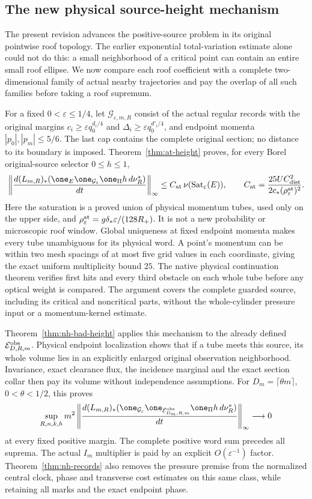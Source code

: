 \subsection*{The new physical source-height mechanism}
The present revision advances the positive-source problem in its
original pointwise roof topology. The earlier exponential
total-variation estimate alone could not do this: a small
neighborhood of a critical point can contain an entire small roof
ellipse. We now compare each roof coefficient with a complete
two-dimensional family of actual nearby trajectories and pay the
overlap of all such families before taking a roof supremum.

For a fixed $0<\varepsilon\le1/4$, let
$\mathcal G_{\varepsilon,m,R}$ consist of the actual regular records
with the original margins
$c_i\ge\varepsilon q_0^{d_i/4}$ and
$\Delta_i\ge\varepsilon q_0^{d'_i/4}$, and endpoint momenta
$|p_0|,|p_m|\le5/6$. The last cap contains the complete original
section; no distance to its boundary is imposed.
Theorem~\ref{thm:at-height} proves, for every Borel original-source
selector $0\le h\le1$,
\[
 \left\|\frac{d(L_{m,R})_*
    (\one_E\one_{\mathcal G_\varepsilon}\one_\Pi h\,d\nu_R^*)}{dt}
                                                    \right\|_\infty
 \le C_{\rm at}\,\nu(\operatorname{Sat}_\varepsilon(E)),
 \qquad C_{\rm at}=\frac{25U C_{\rm dist}^2}
                   {2c_*(\rho_\varepsilon^{\rm at})^2}.
\]
Here the saturation is a proved union of physical momentum tubes,
used only on the upper side, and
$\rho_\varepsilon^{\rm at}=g\delta_*\varepsilon/(128R_+)$.
It is not a new probability or microscopic roof window.
Global uniqueness at fixed endpoint momenta makes every tube
unambiguous for its physical word. A point's momentum can be
within two mesh spacings of at most five grid values in each
coordinate, giving the exact uniform multiplicity bound $25$.
The native physical continuation theorem verifies first hits and
every third obstacle on each whole tube before any optical weight
is compared. The argument covers the complete guarded source,
including its critical and noncritical parts, without the
whole-cylinder pressure input or a momentum-kernel estimate.

Theorem~\ref{thm:nh-bad-height} applies this mechanism to the
already defined $\mathcal E^{\rm obs}_{D,R,m}$.
Physical endpoint localization shows that if a tube meets this
source, its whole volume lies in an explicitly enlarged original
observation neighborhood. Invariance, exact clearance flux, the
incidence marginal and the exact section collar then pay its
volume without independence assumptions. For
$D_m=\lceil\theta m\rceil$, $0<\theta<1/2$, this proves
\[
 \sup_{R,n,k,h}m^2
 \left\|\frac{d(L_{m,R})_*
  (\one_{\mathcal G_\varepsilon}
   \one_{\mathcal E^{\rm obs}_{D_m,R,m}}\one_\Pi h\,d\nu_R^*)}{dt}
                                                     \right\|_\infty
 \longrightarrow0
\]
at every fixed positive margin. The complete positive word sum
precedes all suprema. The actual $I_m$ multiplier is paid by an
explicit $O(\varepsilon^{-1})$ factor.
Theorem~\ref{thm:nh-records} also removes the pressure premise
from the normalized central clock, phase and transverse cost
estimates on this same class, while retaining all marks and the
exact endpoint phase.

